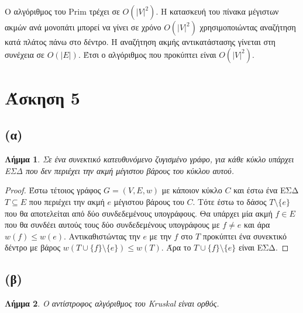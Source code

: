 \documentclass[11pt,a4paper,oneside]{report}
\newtheorem*{lemma}{Λήμμα}
\begin{document}
Ο αλγόριθμος του \textlatin{Prim} τρέχει σε $O( |V|^2 )$. Η κατασκευή του πίνακα μέγιστων ακμών ανά μονοπάτι μπορεί να γίνει σε χρόνο $O( |V|^2 )$ χρησιμοποιώντας αναζήτηση κατά πλάτος πάνω στο δέντρο. Η αναζήτηση ακμής αντικατάστασης γίνεται στη συνέχεια σε $O( |E| )$. Έτσι ο αλγόριθμος που προκύπτει είναι $O( |V|^2 )$.

\section*{Άσκηση 5}
\subsection*{(α)}
\begin{lemma}
Σε ένα συνεκτικό κατευθυνόμενο ζυγισμένο γράφο, για κάθε κύκλο υπάρχει ΕΣΔ που δεν περιέχει την ακμή μέγιστου βάρους του κύκλου αυτού.
\end{lemma}

\begin{proof}
Έστω τέτοιος γράφος $G = (V, E, w)$ με κάποιον κύκλο $C$ και έστω ένα ΕΣΔ $T \subseteq E$ που περιέχει την ακμή $e$ μέγιστου βάρους του $C$. Τότε έστω το δάσος $T \setminus \{ e \}$ που θα αποτελείται από δύο συνδεδεμένους υπογράφους. Θα υπάρχει μία ακμή $f \in E$ που θα συνδέει αυτούς τους δύο συνδεδεμένους υπογράφους με $f \neq e$ και άρα $w( f ) \leq w( e )$. Αντικαθιστώντας την $e$ με την $f$ στο $T$ προκύπτει ένα συνεκτικό δέντρο με βάρος $w( T \cup \{ f \} \setminus \{ e \} ) \leq w( T )$. Άρα το $T \cup \{ f \} \setminus \{ e \}$ είναι ΕΣΔ.
\end{proof}

\subsection*{(β)}
\begin{lemma}
Ο αντίστροφος αλγόριθμος του \textlatin{Kruskal} είναι ορθός.
\end{lemma}
\end{document}
